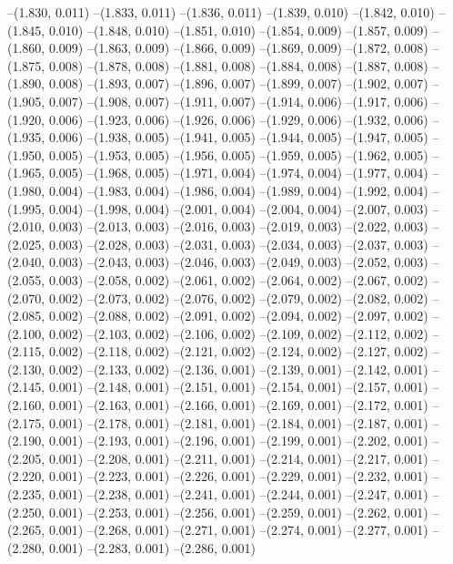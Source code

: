 {--(1.830, 0.011)
--(1.833, 0.011)
--(1.836, 0.011)
--(1.839, 0.010)
--(1.842, 0.010)
--(1.845, 0.010)
--(1.848, 0.010)
--(1.851, 0.010)
--(1.854, 0.009)
--(1.857, 0.009)
--(1.860, 0.009)
--(1.863, 0.009)
--(1.866, 0.009)
--(1.869, 0.009)
--(1.872, 0.008)
--(1.875, 0.008)
--(1.878, 0.008)
--(1.881, 0.008)
--(1.884, 0.008)
--(1.887, 0.008)
--(1.890, 0.008)
--(1.893, 0.007)
--(1.896, 0.007)
--(1.899, 0.007)
--(1.902, 0.007)
--(1.905, 0.007)
--(1.908, 0.007)
--(1.911, 0.007)
--(1.914, 0.006)
--(1.917, 0.006)
--(1.920, 0.006)
--(1.923, 0.006)
--(1.926, 0.006)
--(1.929, 0.006)
--(1.932, 0.006)
--(1.935, 0.006)
--(1.938, 0.005)
--(1.941, 0.005)
--(1.944, 0.005)
--(1.947, 0.005)
--(1.950, 0.005)
--(1.953, 0.005)
--(1.956, 0.005)
--(1.959, 0.005)
--(1.962, 0.005)
--(1.965, 0.005)
--(1.968, 0.005)
--(1.971, 0.004)
--(1.974, 0.004)
--(1.977, 0.004)
--(1.980, 0.004)
--(1.983, 0.004)
--(1.986, 0.004)
--(1.989, 0.004)
--(1.992, 0.004)
--(1.995, 0.004)
--(1.998, 0.004)
--(2.001, 0.004)
--(2.004, 0.004)
--(2.007, 0.003)
--(2.010, 0.003)
--(2.013, 0.003)
--(2.016, 0.003)
--(2.019, 0.003)
--(2.022, 0.003)
--(2.025, 0.003)
--(2.028, 0.003)
--(2.031, 0.003)
--(2.034, 0.003)
--(2.037, 0.003)
--(2.040, 0.003)
--(2.043, 0.003)
--(2.046, 0.003)
--(2.049, 0.003)
--(2.052, 0.003)
--(2.055, 0.003)
--(2.058, 0.002)
--(2.061, 0.002)
--(2.064, 0.002)
--(2.067, 0.002)
--(2.070, 0.002)
--(2.073, 0.002)
--(2.076, 0.002)
--(2.079, 0.002)
--(2.082, 0.002)
--(2.085, 0.002)
--(2.088, 0.002)
--(2.091, 0.002)
--(2.094, 0.002)
--(2.097, 0.002)
--(2.100, 0.002)
--(2.103, 0.002)
--(2.106, 0.002)
--(2.109, 0.002)
--(2.112, 0.002)
--(2.115, 0.002)
--(2.118, 0.002)
--(2.121, 0.002)
--(2.124, 0.002)
--(2.127, 0.002)
--(2.130, 0.002)
--(2.133, 0.002)
--(2.136, 0.001)
--(2.139, 0.001)
--(2.142, 0.001)
--(2.145, 0.001)
--(2.148, 0.001)
--(2.151, 0.001)
--(2.154, 0.001)
--(2.157, 0.001)
--(2.160, 0.001)
--(2.163, 0.001)
--(2.166, 0.001)
--(2.169, 0.001)
--(2.172, 0.001)
--(2.175, 0.001)
--(2.178, 0.001)
--(2.181, 0.001)
--(2.184, 0.001)
--(2.187, 0.001)
--(2.190, 0.001)
--(2.193, 0.001)
--(2.196, 0.001)
--(2.199, 0.001)
--(2.202, 0.001)
--(2.205, 0.001)
--(2.208, 0.001)
--(2.211, 0.001)
--(2.214, 0.001)
--(2.217, 0.001)
--(2.220, 0.001)
--(2.223, 0.001)
--(2.226, 0.001)
--(2.229, 0.001)
--(2.232, 0.001)
--(2.235, 0.001)
--(2.238, 0.001)
--(2.241, 0.001)
--(2.244, 0.001)
--(2.247, 0.001)
--(2.250, 0.001)
--(2.253, 0.001)
--(2.256, 0.001)
--(2.259, 0.001)
--(2.262, 0.001)
--(2.265, 0.001)
--(2.268, 0.001)
--(2.271, 0.001)
--(2.274, 0.001)
--(2.277, 0.001)
--(2.280, 0.001)
--(2.283, 0.001)
--(2.286, 0.001)
}
